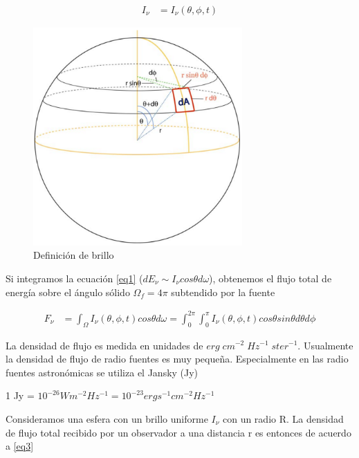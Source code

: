 \documentclass[a4paper]{article}
\begin{document}
\begin{equation} \label{eq2.1}
\begin{split}
   I_\nu  & = I_\nu(\theta,\phi,t) 
\end{split}
\end{equation}


\begin{figure}[h]
\centering
\includegraphics[width=8cm]{emisionesferica.png}
\caption{Definición de brillo}
\label{fig:1.2}
\end{figure}

Si integramos la ecuación \ref{eq1} ($dE_\nu \sim I_\nu cos \theta d\omega$), obtenemos el flujo total de energía sobre el ángulo sólido $\Omega_{f} = 4\pi$ subtendido por la fuente

\begin{equation} \label{eq3}
\begin{split}
   F_\nu  & = \int_{\Omega} I_{\nu}(\theta,\phi,t) cos\theta d\omega = \int_{0}^{2\pi} \int_{0}^{\pi} I_{\nu}(\theta,\phi,t) cos\theta sin\theta d\theta d\phi
\end{split}
\end{equation}


La densidad de flujo es medida en unidades de $erg\;cm^{-2}\;Hz^{-1}\;ster^{-1}$.%
Usualmente la densidad de flujo de radio fuentes es muy pequeña. Especialmente en las radio fuentes astronómicas se utiliza el Jansky (Jy) 

\begin{center}
   1 Jy = $10^{-26}Wm^{-2}Hz^{-1}=10^{-23}ergs^{-1}cm^{-2}Hz^{-1}$
\end{center}
 
Consideramos una esfera con un brillo uniforme $I_{\nu}$ con un radio R. La densidad de flujo total recibido por un observador a una distancia r es entonces de acuerdo a \ref{eq3} 
\end{document}
